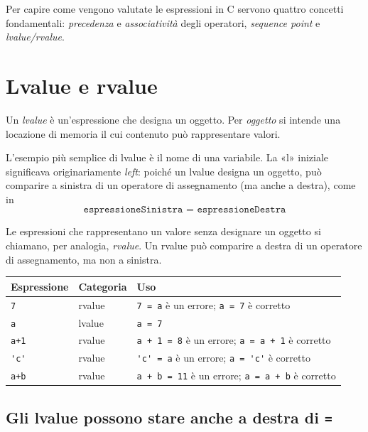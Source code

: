 \documentclass[11pt,a4paper]{article}
\begin{document}
Per capire come vengono valutate le espressioni in C servono quattro concetti fondamentali: \emph{precedenza} e \emph{associatività} degli operatori, \emph{sequence point} e \emph{lvalue/rvalue}.

\section{Lvalue e rvalue}

\begin{definizione}
Un \emph{lvalue} è un'espressione che designa un oggetto. Per \emph{oggetto} si intende una locazione di memoria il cui contenuto può rappresentare valori.
\end{definizione}

L'esempio più semplice di lvalue è il nome di una variabile. La «l» iniziale significava originariamente \emph{left}: poiché un lvalue designa un oggetto, può comparire a sinistra di un operatore di assegnamento (ma anche a destra), come in
\[
\texttt{espressioneSinistra = espressioneDestra}
\]

Le espressioni che rappresentano un valore senza designare un oggetto si chiamano, per analogia, \emph{rvalue}. Un rvalue può comparire a destra di un operatore di assegnamento, ma non a sinistra.

\begin{esempio}
\begin{center}
\begin{tabular}{lll}
\toprule
Espressione & Categoria & Uso \\
\midrule
\lstinline|7|   & rvalue & \lstinline|7 = a| è un errore; \lstinline|a = 7| è corretto\\
\lstinline|a|   & lvalue & \lstinline|a = 7|\\
\lstinline|a+1| & rvalue & \lstinline|a + 1 = 8| è un errore; \lstinline|a = a + 1| è corretto\\
\lstinline|'c'| & rvalue & \lstinline|'c' = a| è un errore; \lstinline|a = 'c'| è corretto\\
\lstinline|a+b| & rvalue & \lstinline|a + b = 11| è un errore; \lstinline|a = a + b| è corretto\\
\bottomrule
\end{tabular}
\end{center}
\end{esempio}

\subsection{Gli lvalue possono stare anche a destra di \texorpdfstring{\lstinline|=|}{=}}
\end{document}
